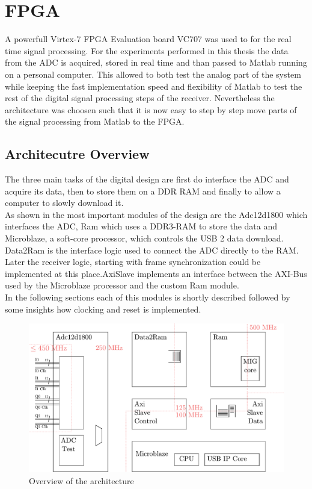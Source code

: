 \chapter{FPGA}
\label{chap:fpga}
A powerfull Virtex-7 \gls{FPGA} Evaluation board VC707
was used to for the real time signal processing.
For the experiments performed in this thesis
the data from the \gls{ADC} is acquired, stored in real time
and than passed to Matlab running on a personal computer.
This allowed to both test the analog part of the system
while keeping the fast implementation speed and flexibility of Matlab
to test the rest of the digital signal processing steps of the receiver.
Nevertheless the architecture was choosen such that it is now easy
to step by step move parts of the signal processing from Matlab to the
\gls{FPGA}. \\

\section{Architecutre Overview}
The three main tasks of the digital design are first do interface
the \gls{ADC} and acquire its data, then to store them on a
\gls{DDR} \gls{RAM} and finally to allow a computer to
slowly download it. \\

As shown in  the most important
modules of the design are the Adc12d1800 which interfaces the
\gls{ADC}, Ram which uses a \gls{DDR}3-\gls{RAM} to store the data
and Microblaze, a soft-core processor, which controls the
\gls{USB} 2 data download. Data2Ram is the interface logic used
to connect the \gls{ADC} directly to the \gls{RAM}. Later the receiver logic,
starting with frame synchronization could be implemented
at this place.AxiSlave implements an interface between the
\acrshort{AXI}-Bus used by the Microblaze processor and the custom
Ram module. \\

In the following sections each of this modules is shortly described followed
by some insights how clocking and reset is implemented. \\

\begin{figure}[ht]
  \centering
  \includegraphics[width=\textwidth]{figures/fpga_architecture_overview}
  \caption{Overview of the architecture}
  \label{fig:fpga_architecture_overview}
\end{figure}

